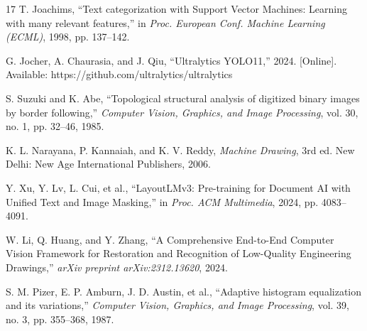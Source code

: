 \documentclass[12pt,a4paper]{article}
\begin{document}
\begin{thebibliography}{17}
T. Joachims, ``Text categorization with Support Vector Machines: Learning with many relevant features,'' in \textit{Proc. European Conf. Machine Learning (ECML)}, 1998, pp. 137--142.

G. Jocher, A. Chaurasia, and J. Qiu, ``Ultralytics YOLO11,'' 2024. [Online]. Available: https://github.com/ultralytics/ultralytics

S. Suzuki and K. Abe, ``Topological structural analysis of digitized binary images by border following,'' \textit{Computer Vision, Graphics, and Image Processing}, vol. 30, no. 1, pp. 32--46, 1985.

K. L. Narayana, P. Kannaiah, and K. V. Reddy, \textit{Machine Drawing}, 3rd ed. New Delhi: New Age International Publishers, 2006.

Y. Xu, Y. Lv, L. Cui, et al., ``LayoutLMv3: Pre-training for Document AI with Unified Text and Image Masking,'' in \textit{Proc. ACM Multimedia}, 2024, pp. 4083--4091.

W. Li, Q. Huang, and Y. Zhang, ``A Comprehensive End-to-End Computer Vision Framework for Restoration and Recognition of Low-Quality Engineering Drawings,'' \textit{arXiv preprint arXiv:2312.13620}, 2024.

S. M. Pizer, E. P. Amburn, J. D. Austin, et al., ``Adaptive histogram equalization and its variations,'' \textit{Computer Vision, Graphics, and Image Processing}, vol. 39, no. 3, pp. 355--368, 1987.

\end{thebibliography}
\end{document}

